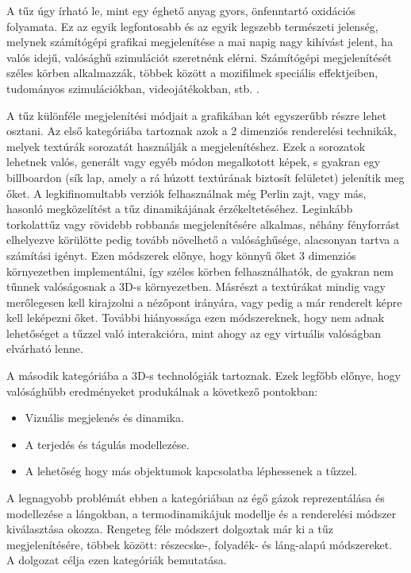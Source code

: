 
A tűz úgy írható le, mint egy éghető anyag gyors, önfenntartó oxidációs folyamata. Ez az egyik legfontosabb és az egyik legszebb természeti jelenség, melynek számítógépi grafikai megjelenítése a mai napig nagy kihívást jelent, ha valós idejű, valósághű szimulációt szeretnénk elérni. Számítógépi megjelenítését széles körben alkalmazzák, többek között a mozifilmek speciális effektjeiben, tudományos szimulációkban, videojátékokban, stb. \cite{steinemannFire}.

A tűz különféle megjelenítési módjait a grafikában két egyszerűbb részre lehet osztani. Az első kategóriába tartoznak azok a 2 dimenziós renderelési technikák, melyek textúrák sorozatát használják a megjelenítéshez. Ezek a sorozatok lehetnek valós, generált vagy egyéb módon megalkotott képek, s gyakran egy billboardon (sík lap, amely a rá húzott textúrának biztosít felületet) jelenítik meg őket. A legkifinomultabb verziók felhasználnak még Perlin zajt, vagy más, hasonló megközelítést a tűz dinamikájának érzékeltetéséhez. Leginkább torkolattűz vagy rövidebb robbanás megjelenítésére alkalmas, néhány fényforrást elhelyezve körülötte pedig tovább növelhető a valósághűsége, alacsonyan tartva a számítási igényt. Ezen módszerek előnye, hogy könnyű őket 3 dimenziós környezetben implementálni, így széles körben felhasználhatók, de gyakran nem tűnnek valóságosnak a 3D-s környezetben. Másrészt a textúrákat mindig vagy merőlegesen kell kirajzolni a nézőpont irányára, vagy pedig a már renderelt képre kell leképezni őket. További hiányossága ezen módszereknek, hogy nem adnak lehetőséget a tűzzel való interakcióra, mint ahogy az egy virtuális valóságban elvárható lenne. \cite{steinemannFire}

A második kategóriába a 3D-s technológiák tartoznak. Ezek legfőbb előnye, hogy valósághűbb eredményeket produkálnak a következő pontokban:
\begin{itemize}
\item
Vizuális megjelenés és dinamika.
\item
A terjedés és tágulás modellezése.
\item
A lehetőség hogy más objektumok kapcsolatba léphessenek a tűzzel.
\end{itemize}
A legnagyobb problémát ebben a kategóriában az égő gázok reprezentálása és modellezése a lángokban, a termodinamikájuk modellje és a renderelési módszer kiválasztása okozza.
Rengeteg féle módszert dolgoztak már ki a tűz megjelenítésére, többek között: részecske-, folyadék- és láng-alapú módszereket. \cite{steinemannFire} \\
A dolgozat célja ezen kategóriák bemutatása.

